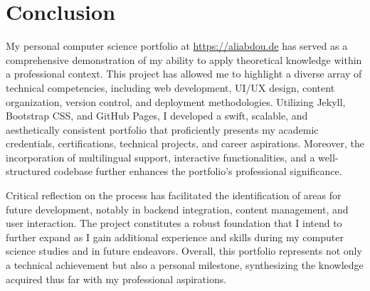 \chapter{Conclusion}
My personal computer science portfolio at \url{https://aliabdou.de} has served as a comprehensive demonstration of my ability to apply theoretical knowledge within a professional context. This project has allowed me to highlight a diverse array of technical competencies, including web development, UI/UX design, content organization, version control, and deployment methodologies. Utilizing Jekyll, Bootstrap CSS, and GitHub Pages, I developed a swift, scalable, and aesthetically consistent portfolio that proficiently presents my academic credentials, certifications, technical projects, and career aspirations. Moreover, the incorporation of multilingual support, interactive functionalities, and a well-structured codebase further enhances the portfolio’s professional significance.

Critical reflection on the process has facilitated the identification of areas for future development, notably in backend integration, content management, and user interaction. The project constitutes a robust foundation that I intend to further expand as I gain additional experience and skills during my computer science studies and in future endeavors. Overall, this portfolio represents not only a technical achievement but also a personal milestone, synthesizing the knowledge acquired thus far with my professional aspirations.\par